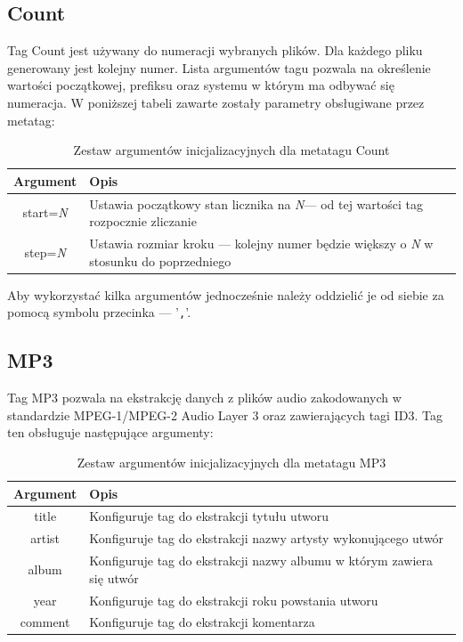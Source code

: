 \subsection{Count}
Tag Count jest używany do numeracji wybranych plików.
Dla każdego pliku generowany jest kolejny numer. Lista argumentów tagu pozwala na określenie wartości początkowej, prefiksu oraz systemu w którym ma odbywać się numeracja.
W poniższej tabeli zawarte zostały parametry obsługiwane przez metatag:
\begin{table}[h]
\begin{center}
\begin{tabular}{| c | p{13cm} |}
\hline
\textbf{Argument} & \textbf{Opis} \\
\hline
start=\textit{N} & Ustawia początkowy stan licznika na \textit{N}--- od tej wartości tag rozpocznie zliczanie \\
step=\textit{N} & Ustawia rozmiar kroku --- kolejny numer będzie większy o \textit{N} w stosunku do poprzedniego \\
\hline
\end{tabular} \end{center}
\caption{Zestaw argumentów inicjalizacyjnych dla metatagu Count}
\end{table}

Aby wykorzystać kilka argumentów jednocześnie należy oddzielić je od siebie za pomocą symbolu przecinka --- '\texttt{,}'.

\subsection{MP3}
Tag MP3 pozwala na ekstrakcję danych z plików audio zakodowanych w standardzie MPEG-1/MPEG-2 Audio Layer 3 oraz zawierających tagi ID3.
Tag ten obsługuje następujące argumenty:
\begin{table}[h]
\begin{center}
\begin{tabular}{| c | p{13cm} |}
\hline
\textbf{Argument} & \textbf{Opis} \\
\hline
title & Konfiguruje tag do ekstrakcji tytułu utworu \\
artist & Konfiguruje tag do ekstrakcji nazwy artysty wykonującego utwór \\
album & Konfiguruje tag do ekstrakcji nazwy albumu w którym zawiera się utwór \\
year & Konfiguruje tag do ekstrakcji roku powstania utworu \\
comment & Konfiguruje tag do ekstrakcji komentarza \\
\hline

\end{tabular}
\caption{Zestaw argumentów inicjalizacyjnych dla metatagu MP3}
\end{center}
\end{table}

